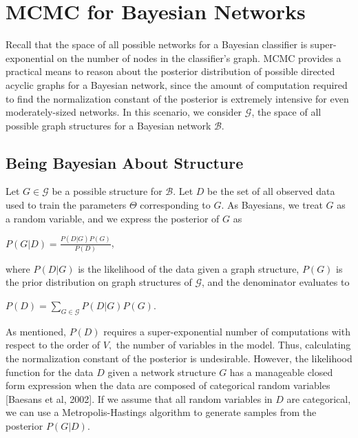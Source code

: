 \documentclass[12pt,twoside]{reedthesis}
\begin{document}
	\section{MCMC for Bayesian Networks}
	Recall that the space of all possible networks for a Bayesian classifier is super-exponential on the number of nodes in the classifier's graph. 
	MCMC provides a practical means to reason about the posterior distribution of possible directed acyclic graphs for a Bayesian network, since the amount of computation required to find the normalization constant of the posterior is extremely intensive for even moderately-sized networks. 
	In this scenario, we consider $\mathcal G$, the space of all possible graph structures for a Bayesian network $\mathcal B$.
		\subsection*{Being Bayesian About Structure}
			Let $G \in \mathcal G$ be a possible structure for $\mathcal B$. 
			Let $D$ be the set of all observed data used to train the parameters $\Theta$ corresponding to $G$. 
			As Bayesians, we treat $G$ as a random variable, and we express the posterior of $G$ as
			\begin{center}
				$P(G | D) = \displaystyle \frac{P(D|G)P(G)}{P(D)}$,
			\end{center}
			where $P(D | G)$ is the likelihood of the data given a graph structure,
			$P(G)$ is the prior distribution on graph structures of $\mathcal G$, and
			the denominator evaluates to
			\begin{center}
				$P(D) = \displaystyle \sum_{G \in \mathcal G}P(D | G) P(G)$.
			\end{center}
			As mentioned, $P(D)$ requires a super-exponential number of computations with respect to the order of $V,$ the number of variables in the model.
			Thus, calculating the normalization constant of the posterior is undesirable. 
			However, the likelihood function for the data $D$ given a network structure $G$ has a manageable closed form expression when the data are composed of categorical random variables [Baesans et al, 2002]. 
			If we assume that all random variables in $D$ are categorical, we can use a Metropolis-Hastings algorithm to generate samples from the posterior $P(G | D)$.
\end{document}
